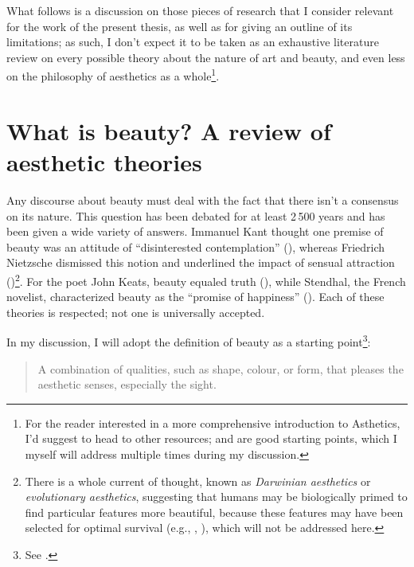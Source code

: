 What follows is a discussion on those pieces of research that I consider relevant for the work of the present thesis, as well as for giving an outline of its limitations; as such, I don't expect it to be taken as an exhaustive literature review on every possible theory about the nature of art and beauty, and even less on the philosophy of aesthetics as a whole\footnote{For the reader interested in a more comprehensive introduction to Asthetics, I'd suggest to head to other resources; \cite{graham2005philosophy} and \cite{tatarkiewicz2006history} are good starting points, which I myself will address multiple times during my discussion.}.

\section{What is beauty? A review of aesthetic theories}\label{sec:aesthetics}
Any discourse about beauty must deal with the fact that there isn't a consensus on its nature. This question has been debated for at least 2\,500 years and has been given a wide variety of answers. Immanuel Kant thought one premise of beauty was an attitude of ``disinterested contemplation'' (\cite{kant2001critique}), whereas Friedrich Nietzsche dismissed this notion and underlined the impact of sensual attraction (\cite{nietzsche1998genealogy})\footnote{There is a whole current of thought, known as \emph{Darwinian aesthetics} or \emph{evolutionary aesthetics}, suggesting that humans may be biologically primed to find particular features more beautiful, because these features may have been selected for optimal survival (e.g., \cite{thornhill1998darwinian}, \cite{grammer2003darwinian}), which will not be addressed here.}. For the poet John Keats, beauty equaled truth (\cite{keats1898ode}), while Stendhal, the French novelist, characterized beauty as the ``promise of happiness'' (\cite{stendhal1927love}). Each of these theories is respected; not one is universally accepted.

In my discussion, I will adopt the \emph{} definition of beauty as a starting point\footnote{See \cite{beautyoxford}.}:
\begin{quote}
A combination of qualities, such as shape, colour, or form, that pleases the aesthetic senses, especially the sight.
\end{quote}

